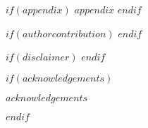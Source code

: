 \documentclass[$journal$, manuscript]{copernicus}
\begin{document}
$if(appendix)$
\appendix
$appendix$
\noappendix
$endif$

$if(authorcontribution)$
$endif$


$if(disclaimer)$
$endif$

$if(acknowledgements)$
\begin{acknowledgements}
$acknowledgements$
\end{acknowledgements}
$endif$







\end{document}
